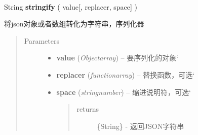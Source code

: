 \documentclass[letterpaper,10pt,english]{sphinxmanual}
\begin{document}
\begin{fulllineitems}
\label{api/core/json/index:json.stringify}~
\begin{DUlineblock}{0em}
\item[] String \textbf{stringify} ( value{[}, replacer, space{]} )
\item[] 将json对象或者数组转化为字符串，序列化器
\end{DUlineblock}
\begin{quote}\begin{description}
\item[{Parameters}] \leavevmode\begin{itemize}
\item {}
\textbf{value} (\emph{Object\textbar{}array}) -- 要序列化的对象{}`

\item {}
\textbf{replacer} (\emph{function\textbar{}array}) -- 替换函数，可选{}`

\item {}
\textbf{space} (\emph{string\textbar{}number}) --
缩进说明符，可选{}`
\begin{quote}\begin{description}
\item[{returns}] \leavevmode
\{String\} - 返回JSON字符串

\end{description}\end{quote}


\end{itemize}

\end{description}\end{quote}

\end{fulllineitems}

\label{api/core/ajax/index:module-io}
\end{document}
